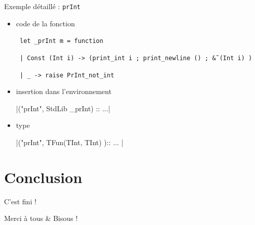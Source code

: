\documentclass{beamer}
\begin{document}
\begin{frame}{Exemple détaillé : \texttt{prInt}}
  \begin{itemize}
  \item code de la fonction

    \texttt{ let \_prInt m = function }

    \texttt{ | Const (Int i) -> (print\_int i ; print\_newline () ; \~\& (Int i) ) }

    \texttt{ | \_ -> raise PrInt\_not\_int }

  \item insertion dans l'environnement

    |("prInt", StdLib _prInt) :: ...|

  \item type

    |("prInt", TFun(TInt, TInt) ):: ... |


  \end{itemize}
\end{frame}

\section{Conclusion}
\begin{frame}{C'est fini !}
  \begin{center}
    \Huge Merci à tous \& Bisous !
  \end{center}
\end{frame}

\begin{frame}
  \begin{center}
    \fontsize{2}{2} \selectfont
    
  \end{center}
\end{frame}
\end{document}
